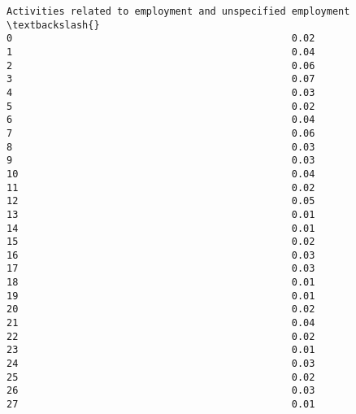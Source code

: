 \documentclass[11pt]{article}
\begin{document}
\begin{Verbatim}[commandchars=\\\{\}]
    Activities related to employment and unspecified employment  \textbackslash{}
0                                                0.02             
1                                                0.04             
2                                                0.06             
3                                                0.07             
4                                                0.03             
5                                                0.02             
6                                                0.04             
7                                                0.06             
8                                                0.03             
9                                                0.03             
10                                               0.04             
11                                               0.02             
12                                               0.05             
13                                               0.01             
14                                               0.01             
15                                               0.02             
16                                               0.03             
17                                               0.03             
18                                               0.01             
19                                               0.01             
20                                               0.02             
21                                               0.04             
22                                               0.02             
23                                               0.01             
24                                               0.03             
25                                               0.02             
26                                               0.03             
27                                               0.01             


\end{Verbatim}
\end{document}
